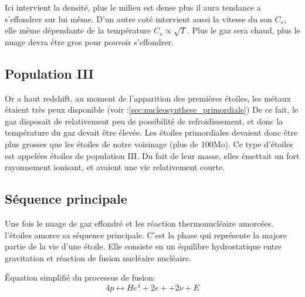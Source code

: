 Ici intervient la densité, plus le milieu est dense plus il aura tendance a s'effondrer sur lui même.
D'un autre coté intervient aussi la vitesse du son $C_s$, elle même dépendante de la température $C_s \propto \sqrt{T}$.
Plus le gaz sera chaud, plus le nuage devra être gros pour pouvoir s’effondrer.

\subsection{Population III}


Or a haut redshift, au moment de l'apparition des premières étoiles, les métaux étaient très peux disponible  (voir :\ref{sec:nucleosynthese_primordiale})
De ce fait, le gaz disposait de relativement peu de possibilité de refroidissement, et donc la température du gaz devait être élevée.
Les étoiles primordiales devaient donc être plus grosses que les étoiles de notre voisinage (plus de 100Mo).
Ce type d'étoiles est appelées étoiles de population III.
Du fait de leur masse, elles émettait un fort rayonnement ionisant, et avaient une vie relativement courte.



%



\subsection{Séquence principale}



Une fois le nuage de gaz effondré et les réaction thermonucléaire amorcées.
l'étoiles amorce sa séquence principale.
C'est la phase qui représente la majore partie de la vie d'une étoile.
Elle consiste en un équilibre hydrostatique entre gravitation et réaction de fusion nucléaire nucléaire.

Équation simplifié du processus de fusion:
\begin{equation}
4p \leftrightarrow He^4 + 2e+ + 2\nu + E
\end{equation}

